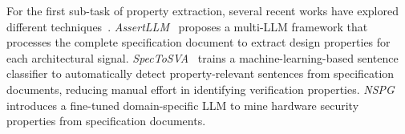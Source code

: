 For the first sub-task of property extraction, several recent works have explored different techniques~\cite{Yan25,parthasarathy2021spectosva,Meng24}.
\textit{AssertLLM}~\cite{Yan25} proposes a multi-LLM framework that processes the complete specification document to extract design properties for each architectural signal.
\textit{SpecToSVA}~\cite{parthasarathy2021spectosva} trains a machine-learning-based sentence classifier to automatically detect property-relevant sentences from specification documents, reducing manual effort in identifying verification properties.
\textit{NSPG}~\cite{Meng24} introduces a fine-tuned domain-specific LLM to  mine hardware security properties from specification documents.


